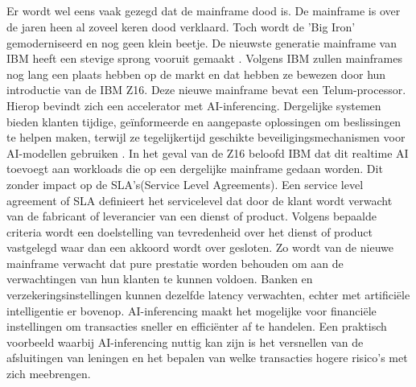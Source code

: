 \subsection{}
\label{sec:De laatste nieuwe mainframe technologie}

Er wordt wel eens vaak gezegd dat de mainframe dood is. De mainframe is over de jaren heen al zoveel keren dood verklaard. Toch wordt de 'Big Iron' gemoderniseerd en nog geen klein beetje. De nieuwste generatie mainframe van IBM heeft een stevige sprong vooruit gemaakt \autocite{Almekinders2022}. Volgens IBM zullen mainframes nog lang een plaats hebben op de markt en dat hebben ze bewezen door hun introductie van de IBM Z16. Deze nieuwe mainframe bevat een Telum-processor. Hierop bevindt zich een accelerator met AI-inferencing. Dergelijke systemen bieden klanten tijdige, geïnformeerde en aangepaste oplossingen om beslissingen te helpen maken, terwijl ze tegelijkertijd geschikte beveiligingsmechanismen voor AI-modellen gebruiken \autocite{Cammarota2020}. In het geval van de Z16 beloofd IBM dat dit realtime AI toevoegt aan workloads die op een dergelijke mainframe gedaan worden. Dit zonder impact op de SLA's(Service Level Agreements). Een service level agreement of SLA definieert het servicelevel dat door de klant wordt verwacht van de fabricant of leverancier van een dienst of product. Volgens bepaalde criteria wordt een doelstelling van tevredenheid over het dienst of product vastgelegd waar dan een akkoord wordt over gesloten. Zo wordt van de nieuwe mainframe verwacht dat pure prestatie worden behouden om aan de verwachtingen van hun klanten te kunnen voldoen. Banken en verzekeringsinstellingen kunnen dezelfde latency verwachten, echter met artificiële intelligentie er bovenop. 
AI-inferencing maakt het mogelijke voor financiële instellingen om transacties sneller en efficiënter af te handelen. Een praktisch voorbeeld waarbij AI-inferencing nuttig kan zijn is het versnellen van de afsluitingen van leningen en het bepalen van welke transacties hogere risico's met zich meebrengen. 








